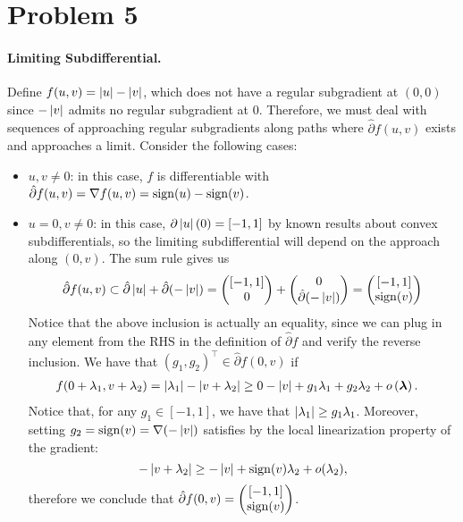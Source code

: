 \documentclass[10pt]{article}
\newcommand{\regdiff}{\hat{\partial}}
\begin{document}
\section*{Problem 5}
\paragraph{Limiting Subdifferential.}
Define $f(u, v) = \left| u \right| - \left| v \right|$, which does not have a regular subgradient
at $(0, 0)$ since $-\left| v \right|$ admits no regular subgradient at $0$. Therefore, we
must deal with sequences of approaching regular subgradients along paths where
$\regdiff f(u, v)$ exists and approaches a limit. Consider the following cases:
\begin{itemize}
\item $u, v \neq 0$: in this case, $f$ is differentiable with $\regdiff f (u,
v) = \grad f (u, v) = \sign(u) - \sign(v)$.
\item $u = 0, v \neq 0$: in this case, $\partial \left| u \right|(0)= [-1, 1]$ by known
results about convex subdifferentials, so the limiting subdifferential will
depend on the approach along $(0, v)$. The sum rule gives us
\[
    \regdiff f(u, v) \subset \regdiff \abs{u} + \regdiff (-\abs{v}) =
    \begin{pmatrix} [-1, 1] \\ 0 \end{pmatrix} + \begin{pmatrix}
        0 \\ \regdiff (-\abs{v}) \end{pmatrix} =
    \begin{pmatrix}
        [-1, 1] \\ \sign(v)
    \end{pmatrix}
\]
Notice that the above inclusion is actually an equality, since we can plug in
any element from the RHS in the definition of $\regdiff f$ and verify the
reverse inclusion. We have that $(g_1, g_2)^\top \in \regdiff f(0, v)$ if
\begin{align*}
    f(0 + \lambda_1, v + \lambda_2) &=
        \left| \lambda_1 \right| - \left| v + \lambda_2 \right| \geq
        0 - \left| v \right| + g_1 \lambda_1 + g_2 \lambda_2 + o\left(
        \bm{\lambda}\right).
\end{align*}
Notice that, for any $g_1 \in [-1, 1]$, we have that $\left| \lambda_1 \right| \geq g_1
\lambda_1$. Moreover, setting $g_2 = \mathrm{sign}(v) = \nabla (-\left| v \right|)$ satisfies by
the local linearization property of the gradient:
\[
    -\left| v + \lambda_2 \right| \geq -\left| v \right| + \mathrm{sign}(v) \lambda_2 + o(\lambda_2),
\]
therefore we conclude that $\regdiff f(0, v) = \pmx{[-1, 1] \\ \sign(v)}$.

\end{itemize}
\end{document}
